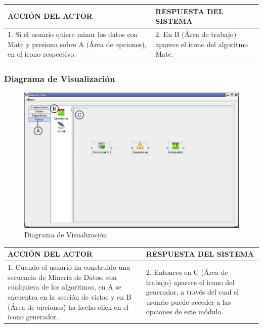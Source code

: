 \begin{center}
\begin{tabular}{|p{60mm}|p{60mm}|}\hline
ACCI\'ON DEL ACTOR & RESPUESTA DEL SISTEMA \\ \hline
1. Si el usuario quiere minar los datos con Mate y presiona sobre A (\'Area de opciones), en el icono respectivo.
& 2. En B (\'Area de trabajo) aparece el icono del algoritmo Mate. \\ \hline
\end{tabular}
\end{center}
\newpage

\subsubsection{Diagrama de Visualizaci\'on}
\begin{figure}[h]
 \centering
 \includegraphics[width=1\textwidth]{images/v01.png}
 \caption{Diagrama de Visualizaci\'on}
\end{figure}

\begin{center}
\begin{tabular}{|p{60mm}|p{60mm}|}\hline
ACCI\'ON DEL ACTOR & RESPUESTA DEL SISTEMA \\ \hline
1. Cuando el usuario ha construido una secuencia de Miner\'ia de Datos, con cualquiera de los algoritmos, en A se
encuentra en la secci\'on de vistas y en B (\'Area de opciones) ha hecho click en el icono generador.
& 2. Entonces en C (\'Area de trabajo) aparece el icono del generador, a trav\'es del cual el usuario puede acceder a las opciones de este m\'odulo. \\ \hline
\end{tabular}
\end{center}
\newpage

